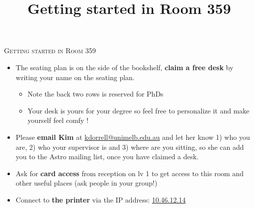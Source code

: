 \documentclass[11pt, oneside, a4paper]{article}
\title{Getting started in Room 359}
\begin{document}
\pagestyle{fancy}
\thispagestyle{firstpage}                                      
{\centering \LARGE \textsc{Getting started in Room 359} \\}
\vspace{0.5em}

\Large
 
 


\begin{tcolorbox}[colback=red!5!white,colframe=red!50!white,title={Essentials!}]
    \begin{itemize}
        \item The seating plan is on the side of the bookshelf, \textbf{claim a free desk} by writing your name on the seating plan.
        \begin{itemize}
            \item Note the back two rows is reserved for PhDs
            \item Your desk is yours for your degree so feel free to personalize it and make yourself feel comfy !
        \end{itemize}
        \item Please \textbf{email Kim} at \url{kdorrell@unimelb.edu.au} and let her know 1) who you are, 2) who your supervisor is and 3) where are you sitting, so she can add you to the Astro mailing list, once you have claimed a desk.
        \item Ask for \textbf{ card access} from reception on lv 1 to get access to this room and other useful places (ask people in your group!)
        \item Connect to \textbf{the printer} via the IP address: \url{10.46.12.14}
    \end{itemize}
\end{tcolorbox}
\end{document}
